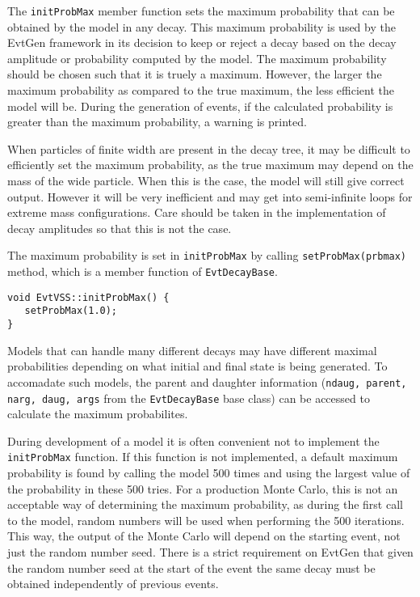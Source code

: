 The {\tt initProbMax} member function
sets the maximum probability that can be obtained by the 
model in any decay. This maximum probability is used by the EvtGen
framework in its decision to keep or reject a 
decay based on the decay amplitude
or probability computed by the model.  The maximum
probability should be chosen such that it is truely
a maximum.  However, the larger the maximum probability
as compared to the true maximum,
the less efficient the model will be.
During the generation
of events, if the calculated probability is greater than the
maximum probability, a warning is printed.  

When particles of finite width are present in the decay tree, it may be
difficult to efficiently set the maximum probability, as the true
maximum may depend on the mass of
the wide particle.  When this is the case, the model will still give
correct output. However it will be very inefficient 
and may get into semi-infinite loops for extreme mass
configurations.
Care should be taken in the implementation
of decay amplitudes so that this is not the case.  

The maximum probability is set in {\tt initProbMax}
by calling {\tt setProbMax(prbmax)} method, which is a 
member function of {\tt EvtDecayBase}.  
\begin{footnotesize}
\begin{verbatim}
void EvtVSS::initProbMax() {
   setProbMax(1.0);
}      
\end{verbatim}
\end{footnotesize}

Models that can handle many different decays may have different 
maximal probabilities depending on what initial and final
state is being generated. To accomadate such models,
the parent and daughter 
information ({\tt ndaug, parent, narg, daug, args} from
the {\tt EvtDecayBase} base class) can be accessed to
calculate the maximum probabilites.

During development of a model it is often convenient not to 
implement the {\tt initProbMax} function. If this
function is not implemented, a default maximum probability is
found by calling the model 500 times and using
the largest value of the probability in these 500 tries.
For a production Monte Carlo, this is not an acceptable way of
determining the maximum probability, as during the first
call to the model, random numbers will
be used when performing the 500 iterations.  This way, the
output of the Monte Carlo will depend on the starting 
event, not just the random number seed.  
There is a strict requirement on EvtGen that 
given the random number seed at the
start of the event the same decay must be obtained independently
of previous events.

